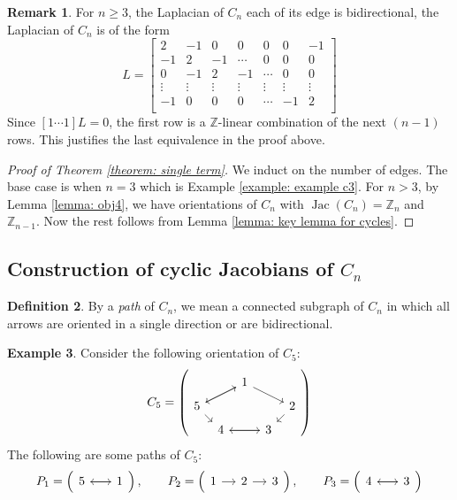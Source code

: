 \documentclass[11pt,reqno]{amsart}
\DeclareMathOperator{\Jac}{Jac}
\newcommand{\Z}{\mathbb{Z}}
\theoremstyle{definition}
\newtheorem{mydef}{Definition}[section]
\newtheorem{myeg}[mydef]{Example}
\newtheorem{rmk}[mydef]{Remark}
\theoremstyle{plain}
\begin{document}
\begin{rmk} \label{remark: obj2}
For $n \ge 3$, the Laplacian of $C_n$ each of its edge is bidirectional, the Laplacian of $C_n$ is of the form 
$$
L = 
\begin{bmatrix}
2 & -1 & 0 & 0 & 0 & 0 & -1   \\
-1 & 2 & -1 & \cdots & 0 & 0 & 0 \\
0 & -1 & 2 & -1 & \cdots & 0 & 0  \\
\vdots & \vdots & \vdots & \vdots & \vdots & \vdots & \vdots  \\
-1 & 0 & 0 & 0 & \cdots & -1 & 2 \\
\end{bmatrix}
$$
Since $[1 \cdots 1] L = 0$, 
the first row is a $\Z$-linear combination of the next $(n-1)$ rows. 
This justifies the last equivalence in the proof above.  
\end{rmk}

\begin{proof}[Proof of Theorem \ref{theorem: single term}]
We induct on the number of edges. The base case is when $n = 3$ which is Example \ref{example: example c3}. For $n > 3$, by Lemma \ref{lemma: obj4}, we have orientations of $C_n$ with $\Jac(C_n) = \mathbb{Z}_n$ and $\mathbb{Z}_{n-1}$. 
Now the rest follows from Lemma \ref{lemma: key lemma for cycles}.
\end{proof}



\subsection{Construction of cyclic Jacobians of $C_n$}


\begin{mydef}
By a \textit{path} of $C_n$, we mean a connected subgraph of $C_n$ in which all arrows are oriented in a single direction or are bidirectional. 
\end{mydef}

\begin{myeg}
Consider the following orientation of $C_5$:
\[
C_5=\left( \begin{tikzcd}[row sep=0.2cm, column sep=0.2cm]
	& & 1 \arrow[drr] \arrow[dll]& &  \\ 
	5 \arrow[urr] \arrow[dr] & & & & 2 \arrow[dl] \\ 
	& 4\arrow[rr] & & 3 \arrow[ll]& 
\end{tikzcd} \right)
\]	
The following are some paths of $C_5$:
\[
P_1=\left( \begin{tikzcd}[row sep=0.3cm, column sep=0.3cm]
5 \arrow[rr] &  &1 \arrow[ll]
\end{tikzcd}\right), \qquad P_2=\left( \begin{tikzcd}[row sep=0.4cm, column sep=0.4cm]
1 \arrow[r] & 2 \arrow[r] &3 
\end{tikzcd}\right), \qquad P_3=\left( \begin{tikzcd}[row sep=0.3cm, column sep=0.3cm]
 4 \arrow[rr] &  &3 \arrow[ll]
\end{tikzcd}\right)
\]
\end{myeg}
\end{document}
